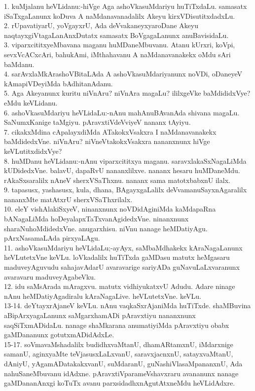 \documentclass{article}
\begin{document}
1. kuMjalanu heVLidanu:-hiVge Aga ashoVkasuMdariyu huTiTxdaLu. samasatx iSaTxgaLanunx koDuva A naMdanavanadalilx Akeyu kirxVDisutitxdadxLu.\\
2. rUpavatiyarU, yoVgayxrU, Ada deVvakaneyxyaroDane Akeyu naqtayxgiVtagaLanAnxDutatx samasatx BoVgagaLanunx anuBavisidaLu.\\
3. viparxcititxyeMbavana maganu huMDaneMbuvanu. Atanu kUrxri, koVpi, sevxVcACxcAri, bahukAmi, iMthahavanu A naMdanavanakekx oMdu sAri baMdanu.\\
4. sarAvxlaMkArashoVBitaLAda A ashoVkasuMdariyanunx noVDi, oDaneyeV kAmapiVDeyiMda bAdhitanAdanu.\\
5. Aga Akeyanunx kuritu niVnAru? niVnAra magaLu? ililxgeVke baMdididxVye? eMdu keVLidanu.\\
6. ashoVkasuMdariyu heVLidaLu:-nAnu mahAnuBAvanAda shivana magaLu. SaNumxKanige taMgiyu. pAravxtiVdeVviyeV nananx tAyiyu.\\
7. cikakxMdina cApalayxdiMda ATakokxVsakxra I naMdanavanakekx baMdidedxVne. niVnAru? niVneVtakokxVsakxra nananxnunx hiVge keVLutitxdidxVye?\\
8. huMDanu heVLidanu:-nAnu viparxcititxya maganu. saravxlakaSxNagaLiMda kUDidedxVne. balavU, dapaRvU nananxlilxve. nananx hesaru huMDaneMdu. rAkaSxsaralilx nAneV sherxVSaThxnu. nananx sama matotxbabxnU ilalx.\\
9. tapasusx, yashasusx, kula, dhana, BAgayxgaLalilx deVvamanuSayxnAgaralilx nananxMte matAtxrU sherxVSaThxrilalx.\\
10. eleY vishAlakiSxyeV, ninanxnunx noVDidAginiMda kaMdapaRna bANagaLiMda hoDeyalapxTaTxvanAgidedxVne. ninanxnunx sharaNuhoMdidedxVne. anugarxhisu. niVnu nanage heMDatiyAgu. pArxNasamaLAda pirxyaLAgu.\\
11. ashoVkasuMdariyu heVLidaLu;-ayAyx, saMbaMdhakekx kAraNagaLanunx heVLutetxVne keVLu. loVkadalilx huTiTxda gaMDasu matutx heMgasaru maduveyAguvudu sahajavAdarU avaravarige sariyADa guNavuLaLxvaranunx avaravaru maduveyAgabeVku.\\
12. idu saMsArada mAragxvu. matutx vidhiyukatxvU Adudu. Adare ninage nAnu heMDatiyAgadiralu kAraNagaLive. heVLutetxVne. keVLu.\\
13-14. deYtayxrAjaneV keVLu. nAnu vaqkaSxrAjaniMda huTiTxde. shaMBuvina aBipArxyagaLanunx saMgarxhamADi pAravxtiyu nananxnunx saqSiTxmADidaLu. nanage shaMkarana anumatiyiMda pAravxtiyu obabx gaMDananunx gotutxmADidAdxLe.\\
15-17. soVmavaMshadalilx budidhxvaMtanU, dhamARtamxnU, iMdarxnige samanU, aginxyaMte teVjasusxLaLxvanU, saravxjacnxnU, satayxvaMtanU, dAniyU, yAgamADatakakxvanU, suMdaranU, guNashiVlasaMpananxnU, Ada nahuSaneMbuvanu idAdxne. pAravxtiVparameVshavxraru avananunx nanage gaMDananAnxgi koTuTx avanu parxsidadhxnAgutAtxneMdu heVLidAdxre.\\
\end{document}
